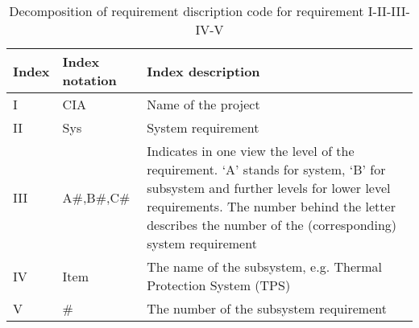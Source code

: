 \begin{table}[H]
\vspace{-4mm}
    \caption {Decomposition of requirement discription code for requirement I-II-III-IV-V}
    \begin{tabular}{|p{}|p{}|p{}|}
    \hline
    Index & Index notation   & Index description                                                                                                                                  \\ \hline \hline
    I            & CIA                     & Name of the project                                                                                                                           \\ \hline
    II           & Sys                     & System requirement                                                                                                                           \\ \hline
    III            & A\#,B\#,C\#                & Indicates in one view the level of the requirement. `A' stands for system, `B' for subsystem  and further levels for lower level requirements. The number behind the letter describes the number of the (corresponding) system requirement
\\ \hline
    IV            & Item                    & The name of the subsystem, e.g. Thermal Protection System (TPS)                                                                                                 \\ \hline
    V            & \#			           & The number of the subsystem requirement                                                                                                      \\ \hline
    \end{tabular}
    \label{tab:description}
\end{table}


